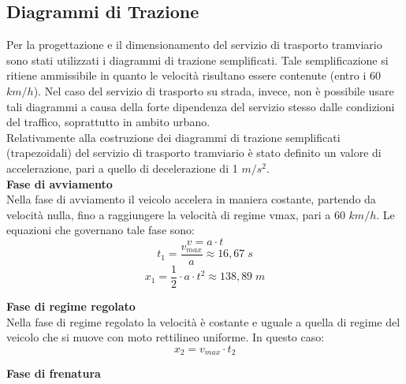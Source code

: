 \documentclass{article}
\begin{document}
\subsection{Diagrammi di Trazione}
Per la progettazione e il dimensionamento del servizio di trasporto tramviario sono stati utilizzati i diagrammi di trazione semplificati. Tale semplificazione si ritiene ammissibile in quanto le velocità risultano essere contenute (entro i 60 $km/h$). Nel caso del servizio di trasporto su strada, invece, non è possibile usare tali diagrammi a causa della forte dipendenza del servizio stesso dalle condizioni del traffico, soprattutto in ambito urbano.\\
Relativamente alla costruzione dei diagrammi di trazione semplificati (trapezoidali) del servizio di trasporto tramviario è stato definito un valore di accelerazione, pari a quello di decelerazione di 1 $m/s^2$.\\ 

\textbf{Fase di avviamento}\\

Nella fase di avviamento il veicolo accelera in maniera costante, partendo da velocità nulla, fino a raggiungere la velocità di regime vmax, pari a 60 $km/h$. Le equazioni che governano tale fase sono:\\
\begin{equation}
v=a\cdot t
\end{equation}
\begin{equation}
t_1=\frac{v_{max}}{a}\approx16,67\;s
\end{equation}
\begin{equation}
x_1=\frac{1}{2}\cdot a\cdot t^2\approx 138,89\;m
\end{equation}

\textbf{Fase di regime regolato}\\

Nella fase di regime regolato la velocità è costante e uguale a quella di regime del veicolo che si muove con moto rettilineo uniforme. In questo caso:
\begin{equation}
x_2=v_{max}\cdot t_2
\end{equation}

\textbf{Fase di frenatura}\\
\end{document}
